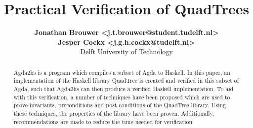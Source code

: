 \documentclass[english]{article}
\begin{document}
\title{\textbf{Practical Verification of QuadTrees}}
\author{
	\textbf{Jonathan Brouwer <j.t.brouwer@student.tudelft.nl>} \\ 
	\textbf{Jesper Cockx <j.g.h.cockx@tudelft.nl>} \\ 
	Delft University of Technology
}
\maketitle

\vspace{-2em}
\begin{abstract}
Agda2hs is a program which compiles a subset of Agda to Haskell. In this paper, an implementation of the Haskell library QuadTree is created and verified in this subset of Agda, such that Agda2hs can then produce a verified Haskell implementation. To aid with this verification, a number of techniques have been proposed which are used to prove invariants, preconditions and post-conditions of the QuadTree library. Using these techniques, the properties of the library have been proven. Additionally, recommendations are made to reduce the time needed for verification.
\end{abstract}









\end{document}
